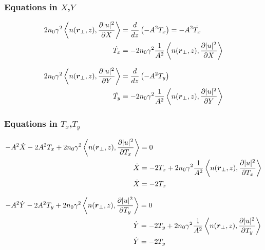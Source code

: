 \subsubsection{Equations in $X$,$Y$}

\begin{equation}
\begin{split}
    2n_0 \gamma^2 \left<n(\mbox{\boldmath{$r$}}_{\perp},z), \frac{\partial |u|^2}{\partial X}\right> &= \frac{d{}}{d{z}}\left(-A^2 T_x \right) =  -A^2 \dot{T_x}\\
        \dot{T_x} &= - 2n_0 \gamma^2 \frac{1}{A^2} \left<n(\mbox{\boldmath{$r$}}_{\perp},z), \frac{\partial |u|^2}{\partial X}\right> 
\end{split}
\end{equation}

\begin{equation}
\begin{split}
   2n_0 \gamma^2 \left<n(\mbox{\boldmath{$r$}}_{\perp},z), \frac{\partial |u|^2}{\partial Y}\right> &= \frac{d{}}{d{z}}\left(-A^2 T_y \right) \\
        \dot{T_y} &= - 2n_0 \gamma^2 \frac{1}{A^2} \left<n(\mbox{\boldmath{$r$}}_{\perp},z), \frac{\partial |u|^2}{\partial Y}\right> 
\end{split}
\end{equation}

\subsubsection{Equations in $T_x$,$T_y$}

\begin{equation}
\begin{split}
   -A^2 \dot{X} - 2A^2 T_x  + 2n_0 \gamma^2 \left<n(\mbox{\boldmath{$r$}}_{\perp},z), \frac{\partial |u|^2}{\partial T_{x}}\right> &= 0\\
   \dot{X} &= - 2T_x  + 2n_0 \gamma^2 \frac{1}{A^2} \left<n(\mbox{\boldmath{$r$}}_{\perp},z), \frac{\partial |u|^2}{\partial T_{x}}\right>\\
   \dot{X} &= - 2T_x 
\end{split}
\end{equation}

\begin{equation}
\begin{split}
   -A^2 \dot{Y} - 2A^2 T_y  + 2n_0 \gamma^2 \left<n(\mbox{\boldmath{$r$}}_{\perp},z), \frac{\partial |u|^2}{\partial T_{y}}\right> &=0\\
      \dot{Y} &= - 2T_y  + 2n_0 \gamma^2 \frac{1}{A^2} \left<n(\mbox{\boldmath{$r$}}_{\perp},z), \frac{\partial |u|^2}{\partial T_{y}}\right>\\
      \dot{Y} &= - 2T_y 
\end{split}
\end{equation}

